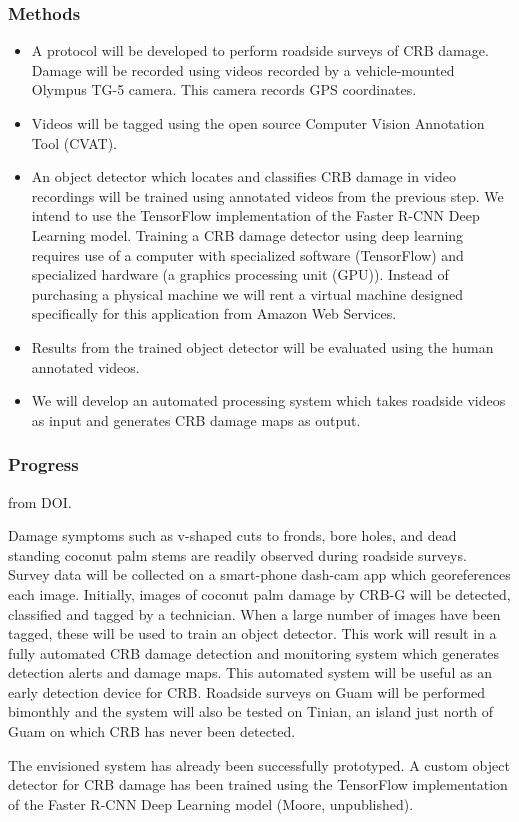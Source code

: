 \documentclass[12pt,letterpaper,english,bibliography=totocnumbered,abstract=on]{scrartcl}
\begin{document}
\begin{framed}
\subsubsection{Methods}

\begin{itemize}
	\item A protocol will be developed to perform roadside surveys of CRB damage. Damage will be recorded using videos recorded by a vehicle-mounted Olympus TG-5 camera. This camera records GPS coordinates.
	\item Videos will be tagged using the open source Computer Vision Annotation Tool (CVAT).
	\item An object detector which locates and classifies CRB damage in video recordings will be trained using annotated videos from the previous step. We intend to use the TensorFlow implementation of the Faster R-CNN Deep Learning model. Training a CRB damage detector using deep learning requires use of a computer with specialized software (TensorFlow) and specialized hardware (a graphics processing unit (GPU)). Instead of purchasing a physical machine we will rent a virtual machine designed specifically for this application from Amazon Web Services.
	\item Results from the trained object detector will be evaluated using the human annotated videos.
	\item We will develop an automated processing system which takes roadside videos as input and generates CRB damage maps as output.
\end{itemize}
\end{framed}

\subsubsection{Progress}

\begin{framed}
	from DOI.
	
	Damage symptoms such as v-shaped cuts to fronds, bore holes, and dead standing coconut palm stems are readily observed during roadside surveys. Survey data will be collected on a smart-phone dash-cam app which georeferences each image. Initially, images of coconut palm damage by CRB-G will be detected, classified and tagged by a technician. When a large number of images have been tagged, these will be used to train an object detector. This work will result in a fully automated CRB damage detection and monitoring system which generates detection alerts and damage maps. This automated system will be useful as an early detection device for CRB. Roadside surveys on Guam will be performed bimonthly and the system will also be tested on Tinian, an island just north of Guam on which CRB has never been detected.
	
	The envisioned system has already been successfully prototyped. A custom object detector for CRB damage has been trained using the TensorFlow implementation of the Faster R-CNN Deep Learning model (Moore, unpublished).
\end{framed}
\end{document}
